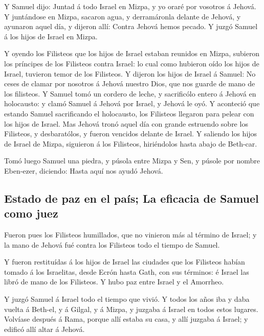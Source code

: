  Y Samuel dijo: Juntad á todo Israel en Mizpa, y yo oraré
por vosotros á Jehová.  Y juntándose en Mizpa, sacaron
agua, y derramáronla delante de Jehová, y ayunaron aquel día, y dijeron
allí: Contra Jehová hemos pecado. Y juzgó Samuel á los hijos de Israel
en Mizpa.

 Y oyendo los Filisteos que los hijos de Israel estaban
reunidos en Mizpa, subieron los príncipes de los Filisteos contra
Israel: lo cual como hubieron oído los hijos de Israel, tuvieron temor
de los Filisteos.  Y dijeron los hijos de Israel á Samuel:
No ceses de clamar por nosotros á Jehová nuestro Dios, que nos guarde de
mano de los filisteos.  Y Samuel tomó un cordero de leche,
y sacrificólo entero á Jehová en holocausto: y clamó Samuel á Jehová por
Israel, y Jehová le oyó.  Y aconteció que estando Samuel
sacrificando el holocausto, los Filisteos llegaron para pelear con los
hijos de Israel. Mas Jehová tronó aquel día con grande estruendo sobre
los Filisteos, y desbaratólos, y fueron vencidos delante de Israel.
 Y saliendo los hijos de Israel de Mizpa, siguieron á los
Filisteos, hiriéndolos hasta abajo de Beth-car.

 Tomó luego Samuel una piedra, y púsola entre Mizpa y
Sen, y púsole por nombre Eben-ezer, diciendo: Hasta aquí nos ayudó
Jehová.

\hypertarget{estado-de-paz-en-el-pauxeds-la-eficacia-de-samuel-como-juez}{%
\subsection{Estado de paz en el país; La eficacia de Samuel como
juez}\label{estado-de-paz-en-el-pauxeds-la-eficacia-de-samuel-como-juez}}

 Fueron pues los Filisteos humillados, que no vinieron
más al término de Israel; y la mano de Jehová fué contra los Filisteos
todo el tiempo de Samuel.

 Y fueron restituídas á los hijos de Israel las ciudades
que los Filisteos habían tomado á los Israelitas, desde Ecrón hasta
Gath, con sus términos: é Israel las libró de mano de los Filisteos. Y
hubo paz entre Israel y el Amorrheo.

 Y juzgó Samuel á Israel todo el tiempo que vivió.
 Y todos los años iba y daba vuelta á Beth-el, y á
Gilgal, y á Mizpa, y juzgaba á Israel en todos estos lugares.
 Volvíase después á Rama, porque allí estaba su casa, y
allí juzgaba á Israel; y edificó allí altar á Jehová.

